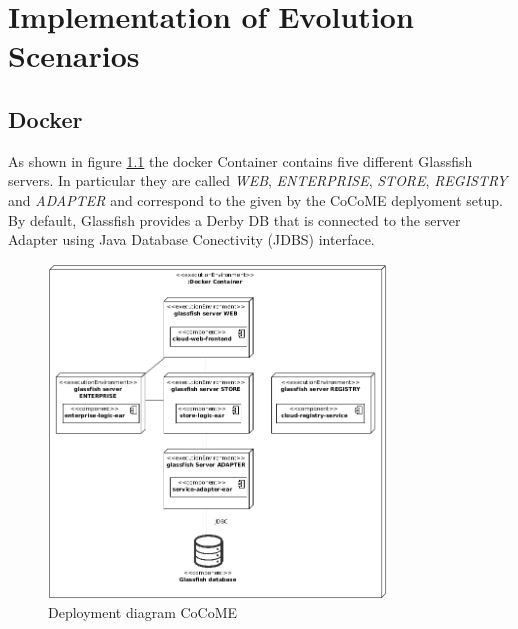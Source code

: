 \chapter{Implementation of Evolution Scenarios}
\section{Docker}
 	As shown in figure \ref*{Deploym_CoCoME} the docker Container contains five different Glassfish servers. In particular they are called \textit{WEB}, \textit{ENTERPRISE}, \textit{STORE}, \textit{REGISTRY} and \textit{ADAPTER} and correspond to the given by the CoCoME deplyoment setup. By default, Glassfish provides a Derby DB that is connected to the server Adapter using Java Database Conectivity (JDBS) interface.\\
 	\begin{figure}[H]
 		\centering
 		\includegraphics[width = 0.8\textwidth]{img/docker_Container_Deployment.png}
 		\caption{Deployment diagram CoCoME}
 		\label{Deploym_CoCoME}
 	\end{figure}
 	
